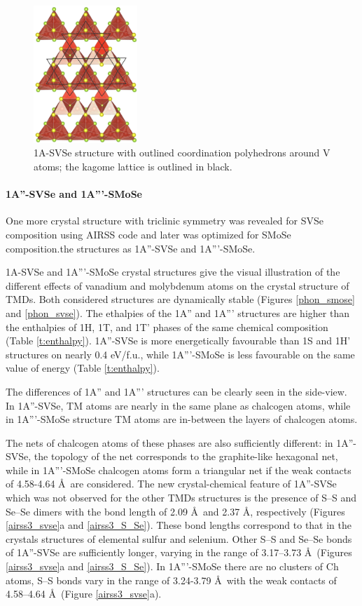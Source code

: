 \documentclass[a4paperm]{article}
\begin{document}
\begin{figure}[H]
        \includegraphics[width=0.35\textwidth]{airss1_v_poly.png}
        \caption{1A-SVSe structure with outlined coordination polyhedrons around V atoms; the kagome lattice is outlined in black.}
\label{airss1_poly}
\end{figure}




\paragraph{1A''-SVSe and 1A'''-SMoSe}
One more crystal structure with triclinic symmetry was revealed for SVSe composition using AIRSS code and later was optimized for SMoSe composition.the structures as 1A''-SVSe and 1A'''-SMoSe.

1A-SVSe and 1A'''-SMoSe crystal structures give the visual illustration of the different effects of vanadium and molybdenum atoms on the crystal structure of TMDs.
Both considered structures are dynamically stable (Figures \ref{phon_smose} and \ref{phon_svse}).
The ethalpies of the 1A'' and 1A''' structures are higher than the enthalpies of 1H, 1T, and 1T' phases of the same chemical composition (Table \ref{t:enthalpy}).
1A''-SVSe is more energetically favourable than 1S and 1H' structures on nearly 0.4 eV/f.u., while 1A'''-SMoSe is less favourable on the same value of energy (Table \ref{t:enthalpy}).

The differences of 1A'' and 1A''' structures can be clearly seen in the side-view.
In 1A''-SVSe, TM atoms are nearly in the same plane as chalcogen atoms, while in 1A'''-SMoSe structure TM atoms are in-between the layers of chalcogen atoms.

The nets of chalcogen atoms of these phases are also sufficiently different: in 1A''-SVSe, the topology of the net corresponds to the graphite-like hexagonal net, while in 1A'''-SMoSe chalcogen atoms form a triangular net if the weak contacts of 4.58-4.64 \AA\ are considered.
The new crystal-chemical feature of 1A''-SVSe which was not observed for the other TMDs structures is the presence of S--S and Se--Se dimers with the bond length of 2.09 \AA\ and 2.37 \AA, respectively (Figures \ref{airss3_svse}a and \ref{airss3_S_Se}).
These bond lengths correspond to that in the crystals structures of elemental sulfur and selenium.
Other S--S and Se--Se bonds of 1A''-SVSe are  sufficiently longer, varying in the range of 3.17--3.73 \AA\ (Figures \ref{airss3_svse}a and \ref{airss3_S_Se}).
In 1A'''-SMoSe there are no clusters of Ch atoms, S--S bonds vary in the range of 3.24-3.79 \AA\ with the weak contacts of 4.58--4.64 \AA\ (Figure \ref{airss3_svse}a).
\end{document}
